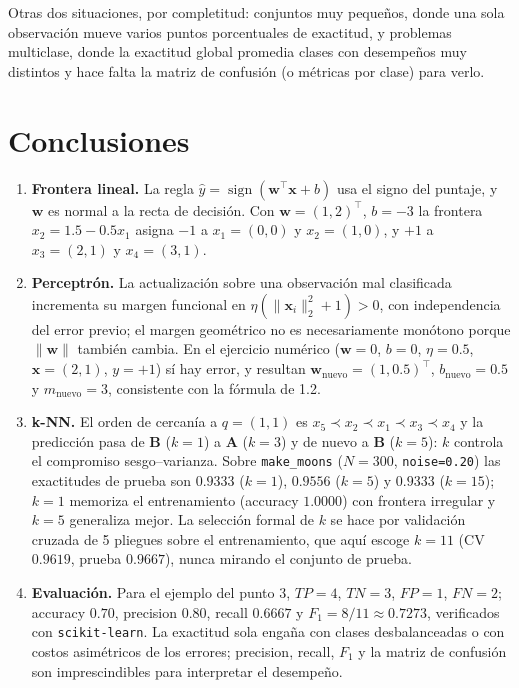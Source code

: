 \documentclass[11pt,a4paper]{article}
\newcommand{\x}{\mathbf{x}}
\newcommand{\w}{\mathbf{w}}
\newcommand{\yhat}{\hat y}
\begin{document}
\noindent
Otras dos situaciones, por completitud: conjuntos muy pequeños, donde una sola
observación mueve varios puntos porcentuales de exactitud, y problemas
multiclase, donde la exactitud global promedia clases con desempeños muy
distintos y hace falta la matriz de confusión (o métricas por clase) para verlo.

\section{Conclusiones}

\begin{enumerate}
\item \textbf{Frontera lineal.} La regla $\yhat = \operatorname{sign}(\w^\top\x+b)$
  usa el signo del puntaje, y $\w$ es normal a la recta de decisión. Con
  $\w = (1,2)^\top$, $b=-3$ la frontera $x_2 = 1.5 - 0.5x_1$ asigna $-1$ a
  $x_1=(0,0)$ y $x_2=(1,0)$, y $+1$ a $x_3=(2,1)$ y $x_4=(3,1)$.
\item \textbf{Perceptrón.} La actualización sobre una observación mal clasificada
  incrementa su margen funcional en $\eta(\lVert \x_i\rVert_2^2+1) > 0$, con
  independencia del error previo; el margen geométrico no es necesariamente
  monótono porque $\lVert\w\rVert$ también cambia. En el ejercicio numérico
  ($\w=0$, $b=0$, $\eta=0.5$, $\x=(2,1)$, $y=+1$) sí hay error, y resultan
  $\w_{\text{nuevo}} = (1,0.5)^\top$, $b_{\text{nuevo}} = 0.5$ y
  $m_{\text{nuevo}} = 3$, consistente con la fórmula de 1.2.
\item \textbf{k-NN.} El orden de cercanía a $q=(1,1)$ es
  $x_5 \prec x_2 \prec x_1 \prec x_3 \prec x_4$ y la predicción pasa de \textbf{B}
  ($k=1$) a \textbf{A} ($k=3$) y de nuevo a \textbf{B} ($k=5$): $k$ controla el
  compromiso sesgo--varianza. Sobre \texttt{make\_moons}
  ($N=300$, \texttt{noise=0.20}) las exactitudes de prueba son $0.9333$
  ($k=1$), $0.9556$ ($k=5$) y $0.9333$ ($k=15$); $k=1$ memoriza el entrenamiento
  (accuracy $1.0000$) con frontera irregular y $k=5$ generaliza mejor. La
  selección formal de $k$ se hace por validación cruzada de 5 pliegues sobre el
  entrenamiento, que aquí escoge $k=11$ (CV $0.9619$, prueba $0.9667$), nunca
  mirando el conjunto de prueba.
\item \textbf{Evaluación.} Para el ejemplo del punto 3,
  $TP=4$, $TN=3$, $FP=1$, $FN=2$; accuracy $0.70$, precision $0.80$, recall
  $0.6667$ y $F_1 = 8/11 \approx 0.7273$, verificados con \texttt{scikit-learn}.
  La exactitud sola engaña con clases desbalanceadas o con costos asimétricos de
  los errores; precision, recall, $F_1$ y la matriz de confusión son
  imprescindibles para interpretar el desempeño.
\end{enumerate}
\end{document}
